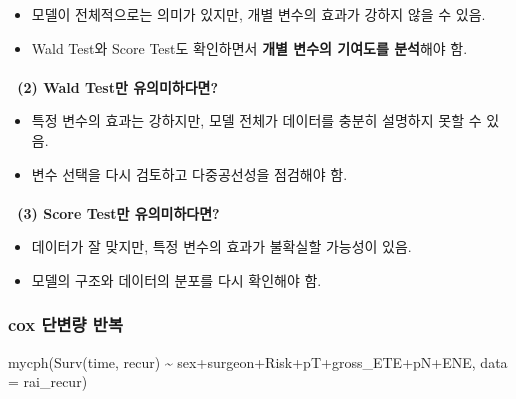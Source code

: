 \documentclass[
  letterpaper,
  DIV=11,
  numbers=noendperiod]{scrartcl}
\makeatletter
\let\oldparagraph\paragraph
\renewcommand{\paragraph}{
    \@ifstar
      \xxxParagraphStar
      \xxxParagraphNoStar
  }
\newcommand{\xxxParagraphStar}[1]{\oldparagraph*{#1}\mbox{}}
\newcommand{\xxxParagraphNoStar}[1]{\oldparagraph{#1}\mbox{}}
\newenvironment{Shaded}{\begin{snugshade}}{\end{snugshade}}
\newcommand{\AttributeTok}[1]{\textcolor[rgb]{0.40,0.45,0.13}{#1}}
\newcommand{\FunctionTok}[1]{\textcolor[rgb]{0.28,0.35,0.67}{#1}}
\newcommand{\NormalTok}[1]{\textcolor[rgb]{0.00,0.23,0.31}{#1}}
\newcommand{\SpecialCharTok}[1]{\textcolor[rgb]{0.37,0.37,0.37}{#1}}
\providecommand{\tightlist}{%
  \setlength{\itemsep}{0pt}\setlength{\parskip}{0pt}}\usepackage{longtable,booktabs,array}
\makeatother
\begin{document}
\begin{itemize}
\tightlist
\item
  모델이 전체적으로는 의미가 있지만, 개별 변수의 효과가 강하지 않을 수
  있음.\\
\item
  Wald Test와 Score Test도 확인하면서 \textbf{개별 변수의 기여도를
  분석}해야 함.
\end{itemize}

\paragraph{\texorpdfstring{\textbf{📌 (2) Wald Test만
유의미하다면?}}{📌 (2) Wald Test만 유의미하다면?}}\label{wald-testuxb9cc-uxc720uxc758uxbbf8uxd558uxb2e4uxba74}

\begin{itemize}
\tightlist
\item
  특정 변수의 효과는 강하지만, 모델 전체가 데이터를 충분히 설명하지 못할
  수 있음.\\
\item
  변수 선택을 다시 검토하고 다중공선성을 점검해야 함.
\end{itemize}

\paragraph{\texorpdfstring{\textbf{📌 (3) Score Test만
유의미하다면?}}{📌 (3) Score Test만 유의미하다면?}}\label{score-testuxb9cc-uxc720uxc758uxbbf8uxd558uxb2e4uxba74}

\begin{itemize}
\tightlist
\item
  데이터가 잘 맞지만, 특정 변수의 효과가 불확실할 가능성이 있음.\\
\item
  모델의 구조와 데이터의 분포를 다시 확인해야 함.
\end{itemize}

\subsubsection{cox 단변량
반복}\label{cox-uxb2e8uxbcc0uxb7c9-uxbc18uxbcf5}

\begin{Shaded}
\begin{Highlighting}[]
\FunctionTok{mycph}\NormalTok{(}\FunctionTok{Surv}\NormalTok{(time, recur) }\SpecialCharTok{\textasciitilde{}}\NormalTok{ sex}\SpecialCharTok{+}\NormalTok{surgeon}\SpecialCharTok{+}\NormalTok{Risk}\SpecialCharTok{+}\NormalTok{pT}\SpecialCharTok{+}\NormalTok{gross\_ETE}\SpecialCharTok{+}\NormalTok{pN}\SpecialCharTok{+}\NormalTok{ENE, }\AttributeTok{data =}\NormalTok{ rai\_recur)}
\end{Highlighting}
\end{Shaded}
\end{document}
